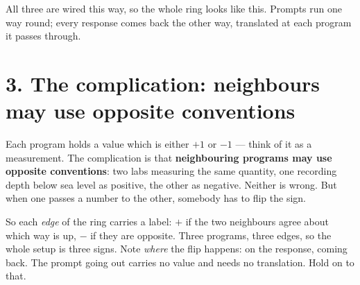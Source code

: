 \documentclass[11pt,a4paper]{article}
\begin{document}
All three are wired this way, so the whole ring looks like this. Prompts run
one way round; every response comes back the other way, translated at each
program it passes through.

\begin{center}
\end{center}

\section*{3. The complication: neighbours may use opposite conventions}

Each program holds a value which is either $+1$ or $-1$ --- think of it as a
measurement. The complication is that \textbf{neighbouring programs may use
opposite conventions}: two labs measuring the same quantity, one recording
depth below sea level as positive, the other as negative. Neither is wrong.
But when one passes a number to the other, somebody has to flip the sign.

So each \emph{edge} of the ring carries a label: $+$ if the two neighbours
agree about which way is up, $-$ if they are opposite. Three programs, three
edges, so the whole setup is three signs. Note \emph{where} the flip happens:
on the response, coming back. The prompt going out carries no value and needs
no translation. Hold on to that.
\end{document}
